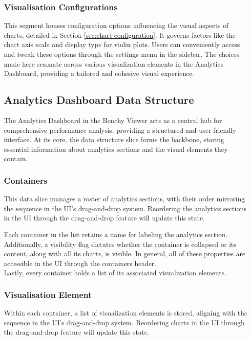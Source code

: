 \subsubsection{Visualisation Configurations}

This segment houses configuration options influencing the visual aspects of charts, detailed in Section \ref{sec:chart-configuration}. It governs factors like the chart axis scale and display type for violin plots. Users can conveniently access and tweak these options through the settings menu in the sidebar. The choices made here resonate across various visualization elements in the Analytics Dashboard, providing a tailored and cohesive visual experience.










\subsection{Analytics Dashboard Data Structure}\label{sec:analytics-dashboard}

The Analytics Dashboard in the Benchy Viewer acts as a central hub for comprehensive performance analysis, providing a structured and user-friendly interface. At its core, the data structure slice forms the backbone, storing essential information about analytics sections and the visual elements they contain.

\subsubsection{Containers}
This data slice manages a roster of analytics sections, with their order mirroring the sequence in the UI's drag-and-drop system. Reordering the analytics sections in the UI through the drag-and-drop feature will update this state.

Each container in the list retains a name for labeling the analytics section. Additionally, a visibility flag dictates whether the container is collapsed or its content, along with all its charts, is visible. In general, all of these properties are accessible in the UI through the containers header.\\
Lastly, every container holds a list of its associated visualization elements. 

\subsubsection{Visualisation Element}
Within each container, a list of visualization elements is stored, aligning with the sequence in the UI's drag-and-drop system. Reordering charts in the UI through the drag-and-drop feature will update this state.

